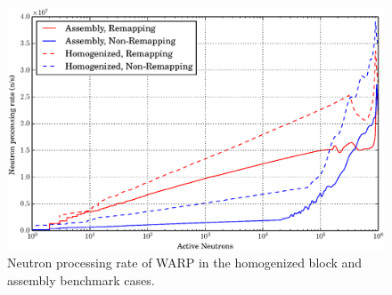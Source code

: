 \begin{figure}[h!]
\centering
\includegraphics[width=\textwidth]{graphics/finalresults/process_rate.eps}
\caption{Neutron processing rate of WARP in the homogenized block and assembly benchmark cases. \label{process_rate} }
\end{figure}

